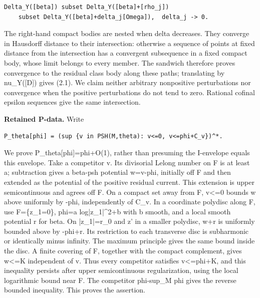 \documentclass[11pt]{article}
\begin{document}
\begin{Verbatim}[breaklines=true,fontsize=\small]
Delta_Y([beta]) subset Delta_Y([beta]+[rho_j])
    subset Delta_Y([beta]+delta_j[Omega]),  delta_j -> 0.
\end{Verbatim}

The right-\allowbreak{}hand compact bodies are nested when delta decreases. They converge in Hausdorff distance to their intersection: otherwise a sequence of points at fixed distance from the intersection has a convergent subsequence in a fixed compact body, whose limit belongs to every member. The sandwich therefore proves convergence to the residual class body along these paths; translating by nu\_\allowbreak{}Y([D]) gives (2.1). We claim neither arbitrary nonpositive perturbations nor convergence when the positive perturbations do not tend to zero. Rational cofinal epsilon sequences give the same intersection.

\textbf{Retained P-\allowbreak{}data.} Write

\begin{Verbatim}[breaklines=true,fontsize=\small]
P_theta[phi] = (sup {v in PSH(M,theta): v<=0, v<=phi+C_v})^*.
\end{Verbatim}

We prove P\_\allowbreak{}theta[phi]=\allowbreak{}phi+O(1), rather than presuming the I-\allowbreak{}envelope equals this envelope. Take a competitor v. Its divisorial Lelong number on F is at least a; subtraction gives a beta-\allowbreak{}psh potential w=\allowbreak{}v-\allowbreak{}phi, initially off F and then extended as the potential of the positive residual current. This extension is upper semicontinuous and agrees off F. On a compact set away from F, v<=\allowbreak{}0 bounds w above uniformly by -\allowbreak{}phi, independently of C\_\allowbreak{}v. In a coordinate polydisc along F, use F=\allowbreak{}\{z\_\allowbreak{}1=\allowbreak{}0\}, phi=\allowbreak{}a log|z\_\allowbreak{}1|\textasciicircum{}\allowbreak{}2+b with b smooth, and a local smooth potential r for beta. On |z\_\allowbreak{}1|=\allowbreak{}r\_\allowbreak{}0 and z' in a smaller polydisc, w+r is uniformly bounded above by -\allowbreak{}phi+r. Its restriction to each transverse disc is subharmonic or identically minus infinity. The maximum principle gives the same bound inside the disc. A finite covering of F, together with the compact complement, gives w<=\allowbreak{}K independent of v. Thus every competitor satisfies v<=\allowbreak{}phi+K, and this inequality persists after upper semicontinuous regularization, using the local logarithmic bound near F. The competitor phi-\allowbreak{}sup\_\allowbreak{}M phi gives the reverse bounded inequality. This proves the assertion.
\end{document}
